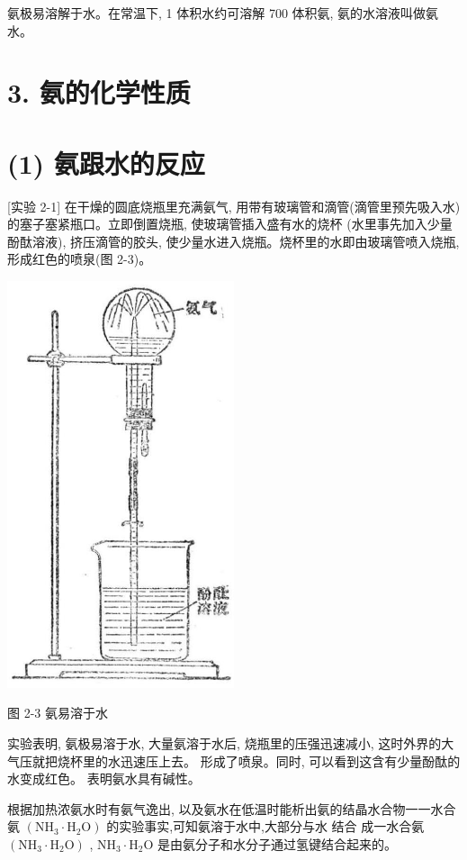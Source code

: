 \documentclass[10pt]{article}
\begin{document}
氨极易溶解于水。在常温下, 1 体积水约可溶解 700 体积氨, 氨的水溶液叫做氨水。

\section*{3. 氨的化学性质}

\section*{(1) 氨跟水的反应}

[实验 2-1] 在干燥的圆底烧瓶里充满氨气, 用带有玻璃管和滴管(滴管里预先吸入水)的塞子塞紧瓶口。立即倒置烧瓶, 使玻璃管插入盛有水的烧杯 (水里事先加入少量酚酞溶液), 挤压滴管的胶头, 使少量水进入烧瓶。烧杯里的水即由玻璃管喷入烧瓶, 形成红色的喷泉(图 2-3)。

\begin{center}
\includegraphics[max width=0.5\textwidth]{images/01912d13-9986-7822-a012-3f3f7be99dcb_42_903538.jpg}
\end{center}

图 2-3 氨易溶于水

实验表明, 氨极易溶于水, 大量氨溶于水后, 烧瓶里的压强迅速减小, 这时外界的大气压就把烧杯里的水迅速压上去。 形成了喷泉。同时, 可以看到这含有少量酚酞的水变成红色。 表明氨水具有碱性。

根据加热浓氨水时有氨气逸出, 以及氨水在低温时能析出氨的结晶水合物一一水合氨 \(\left( {{\mathrm{{NH}}}_{3} \cdot {\mathrm{H}}_{2}\mathrm{O}}\right)\) 的实验事实,可知氨溶于水中,大部分与水 结合 成一水合氨 \(\left( {{\mathrm{{NH}}}_{3} \cdot {\mathrm{H}}_{2}\mathrm{O}}\right)\) , \({\mathrm{{NH}}}_{3} \cdot {\mathrm{H}}_{2}\mathrm{O}\) 是由氨分子和水分子通过氢键结合起来的。
\end{document}
